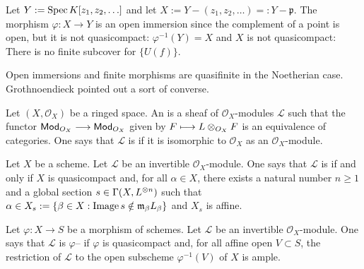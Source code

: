 \documentclass [11 pt, oneside] {article}
\begin{document}
\begin{example}[ ]\label{remember}\text{}
Let $Y:= \operatorname{Spec} K[z_1,z_2,\hdots]$ and let $X := Y - (z_1,z_2,\hdots) =: Y-\mathfrak{p}$. The morphism $\varphi : X\longrightarrow Y$ is an open immersion since the complement of a point is open, but it is not quasicompact: $\varphi^{-1}(Y)=X$ and $X$ is not quasicompact: There is no finite subcover for $\{U(f)\}$.
\end{example}

Open immersions and finite morphisms are quasifinite in the Noetherian case. Grothnoendieck pointed out a sort of converse.

\begin{definition}\label{}\text{}
Let $(X,\mathscr{O}_X)$ be a ringed space. An  is a sheaf of $\mathscr{O}_X$-modules $\mathscr{L}$ such that the functor $\textsf{Mod}_{\relax{O}_X}\longrightarrow \textsf{Mod}_{\relax{O}_X}$ given by $\relax{F}\longmapsto \relax{L}\otimes_{\relax{O}_X} \relax{F}$ is an equivalence of categories. One says that $\mathscr{L}$ is  if it is isomorphic to $\mathscr{O}_X$ as an $\mathscr{O}_X$-module.
\end{definition}

\begin{definition}\label{}\text{}
Let $X$ be a scheme. Let $\mathscr{L}$ be an invertible $\mathscr{O}_X$-module. One says that $\mathscr{L}$ is  if and only if $X$ is quasicompact and, for all $\alpha\in X$, there exists a natural number $n\ge 1$ and a global section $s\in \Gamma(X, \relax{L}^{\otimes n})$ such that $\alpha \in X_s := \{  \beta\in X :\operatorname{Image} s\notin \mathfrak{m}_\beta \relax{L}_\beta \}$ and $X_s$ is affine.
\end{definition}

\begin{definition}\label{}\text{}
Let $\varphi:X\longrightarrow S$ be a morphism of schemes. Let $\mathscr{L}$ be an invertible $\mathscr{O}_X$-module. One says that $\mathscr{L}$ is $\varphi$-- if $\varphi$ is quasicompact and, for all affine open $V\subset S$, the restriction of $\mathscr{L}$ to the open subscheme $\varphi ^{-1}(V)$ of $X$ is ample.
\end{definition}
\end{document}
